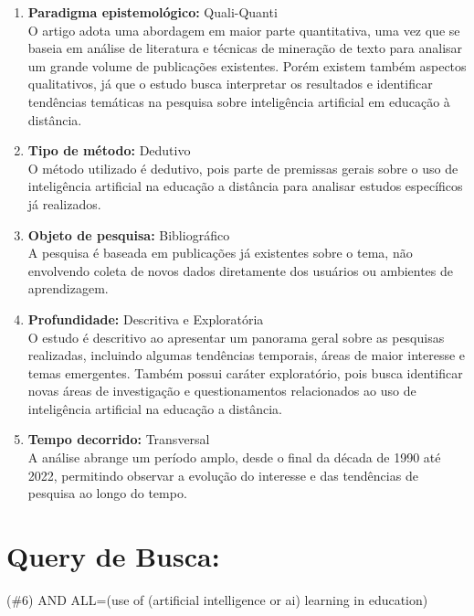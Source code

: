 \documentclass{article}
\begin{document}
\begin{enumerate}


    \item \textbf{Paradigma epistemológico:} Quali-Quanti \\
    O artigo adota uma abordagem em maior parte quantitativa, uma vez que se baseia em análise de literatura e técnicas de mineração de texto para analisar um grande volume de publicações existentes. Porém existem também aspectos qualitativos, já que o estudo busca interpretar os resultados e identificar tendências temáticas na pesquisa sobre inteligência artificial em educação à distância.
    
    \item \textbf{Tipo de método:} Dedutivo \\
    O método utilizado é dedutivo, pois parte de premissas gerais sobre o uso de inteligência artificial na educação a distância para analisar estudos específicos já realizados.
    
    \item \textbf{Objeto de pesquisa:} Bibliográfico \\
    A pesquisa é baseada em publicações já existentes sobre o tema, não envolvendo coleta de novos dados diretamente dos usuários ou ambientes de aprendizagem.
    
    \item \textbf{Profundidade:} Descritiva e Exploratória \\
    O estudo é descritivo ao apresentar um panorama geral sobre as pesquisas realizadas, incluindo algumas tendências temporais, áreas de maior interesse e temas emergentes. Também possui caráter exploratório, pois busca identificar novas áreas de investigação e questionamentos relacionados ao uso de inteligência artificial na educação a distância.
    
    \item \textbf{Tempo decorrido:} Transversal \\
    A análise abrange um período amplo, desde o final da década de 1990 até 2022, permitindo observar a evolução do interesse e das tendências de pesquisa ao longo do tempo.
\end{enumerate}

\section{Query de Busca:} (\#6) AND ALL=(use of (artificial intelligence or ai) learning in education)
\end{document}
